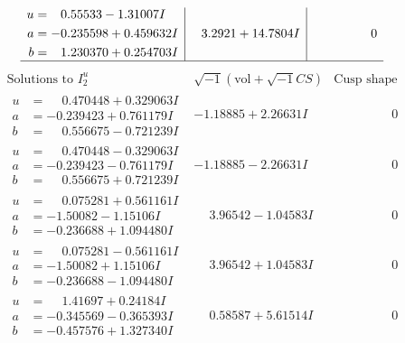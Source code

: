 \documentclass[1p]{elsarticle_modified}
\theoremstyle{definition}
\newcommand{\I}{\sqrt{-1}}
\begin{document}
$$\begin{array}{c|c|c}
\begin{aligned}
u &= \phantom{-}0.55533 - 1.31007 I \\
a &= -0.235598 + 0.459632 I \\
b &= \phantom{-}1.230370 + 0.254703 I\end{aligned}
 & \phantom{-}3.2921 + 14.7804 I & \phantom{-0.000000 } 0\\
 \hline 
 \end{array}$$\newpage$$\begin{array}{c|c|c}  
\text{Solutions to }I^u_{2}& \I (\text{vol} + \sqrt{-1}CS) & \text{Cusp shape}\\
 \hline 
\begin{aligned}
u &= \phantom{-}0.470448 + 0.329063 I \\
a &= -0.239423 + 0.761179 I \\
b &= \phantom{-}0.556675 - 0.721239 I\end{aligned}
 & -1.18885 + 2.26631 I & \phantom{-0.000000 } 0 \\ \hline\begin{aligned}
u &= \phantom{-}0.470448 - 0.329063 I \\
a &= -0.239423 - 0.761179 I \\
b &= \phantom{-}0.556675 + 0.721239 I\end{aligned}
 & -1.18885 - 2.26631 I & \phantom{-0.000000 } 0 \\ \hline\begin{aligned}
u &= \phantom{-}0.075281 + 0.561161 I \\
a &= -1.50082 - 1.15106 I \\
b &= -0.236688 + 1.094480 I\end{aligned}
 & \phantom{-}3.96542 - 1.04583 I & \phantom{-0.000000 } 0 \\ \hline\begin{aligned}
u &= \phantom{-}0.075281 - 0.561161 I \\
a &= -1.50082 + 1.15106 I \\
b &= -0.236688 - 1.094480 I\end{aligned}
 & \phantom{-}3.96542 + 1.04583 I & \phantom{-0.000000 } 0 \\ \hline\begin{aligned}
u &= \phantom{-}1.41697 + 0.24184 I \\
a &= -0.345569 - 0.365393 I \\
b &= -0.457576 + 1.327340 I\end{aligned}
 & \phantom{-}0.58587 + 5.61514 I & \phantom{-0.000000 } 0 \\ \hline\begin{aligned}

\end{aligned}
\end{array}$$
\end{document}
